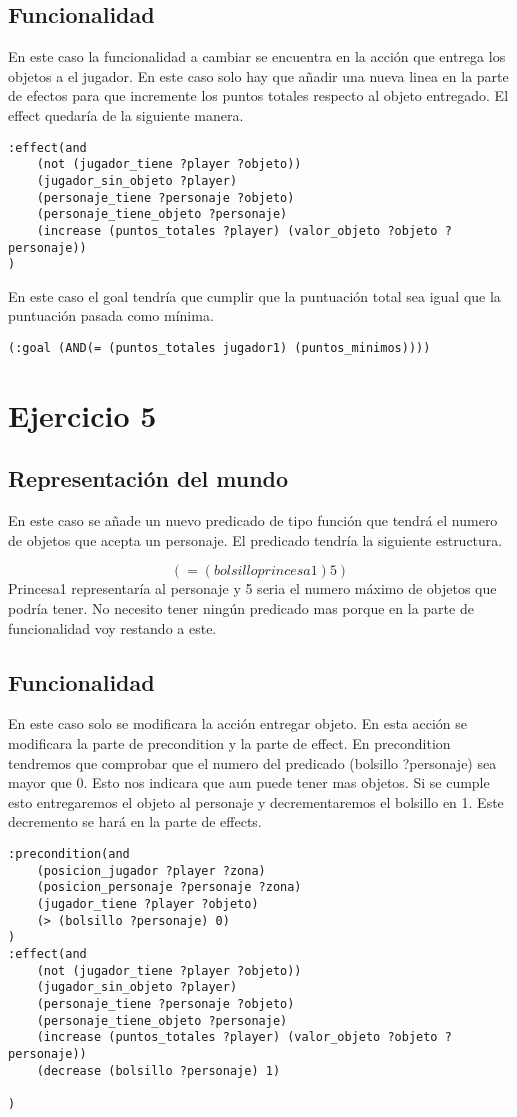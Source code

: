 \documentclass[]{article}
\begin{document}
\subsection{Funcionalidad}
En este caso la funcionalidad a cambiar se encuentra en la acción que entrega los objetos a el jugador.
En este caso solo hay que añadir una nueva linea en la parte de efectos para que incremente los puntos totales respecto al objeto entregado. El effect quedaría de la siguiente manera.
	\begin{lstlisting}
:effect(and 
	(not (jugador_tiene ?player ?objeto))
	(jugador_sin_objeto ?player)
	(personaje_tiene ?personaje ?objeto)
	(personaje_tiene_objeto ?personaje)
	(increase (puntos_totales ?player) (valor_objeto ?objeto ?personaje))
)
	\end{lstlisting}
	
En este caso el goal tendría que cumplir que la puntuación total sea igual que la puntuación pasada como mínima.

	
	\begin{lstlisting}
(:goal (AND(= (puntos_totales jugador1) (puntos_minimos))))
	\end{lstlisting}
\newpage	
\section{Ejercicio 5}
\subsection{Representación del mundo}
En este caso se añade un nuevo predicado de tipo función que tendrá el numero de objetos que acepta un personaje. El predicado tendría la siguiente estructura.

$$
(= (bolsillo princesa1) 5)
$$
Princesa1 representaría al personaje y 5 seria el numero máximo de objetos que podría tener. No necesito tener ningún predicado mas porque en la parte de funcionalidad voy restando a este.

\subsection{Funcionalidad}
	En este caso solo se modificara la acción entregar objeto. En esta acción se modificara la parte de precondition y la parte de effect. 
	En precondition tendremos que comprobar que el numero del predicado (bolsillo ?personaje) sea mayor que 0. Esto nos indicara que aun puede tener mas objetos. Si se cumple esto entregaremos el objeto al personaje y decrementaremos el bolsillo en 1. Este decremento se hará en la parte de effects.
	\begin{lstlisting}
:precondition(and
	(posicion_jugador ?player ?zona)
	(posicion_personaje ?personaje ?zona)
	(jugador_tiene ?player ?objeto)
	(> (bolsillo ?personaje) 0)
)
:effect(and 
	(not (jugador_tiene ?player ?objeto))
	(jugador_sin_objeto ?player)
	(personaje_tiene ?personaje ?objeto)
	(personaje_tiene_objeto ?personaje)
	(increase (puntos_totales ?player) (valor_objeto ?objeto ?personaje))
	(decrease (bolsillo ?personaje) 1)
	
)
	\end{lstlisting}
\end{document}
